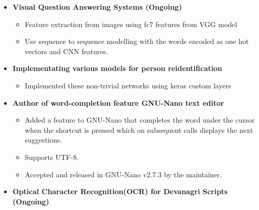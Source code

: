 \documentclass[10pt,a4paper,sans]{moderncv}        %
\begin{document}
\begin{itemize}

	\item{\textbf{Visual Question Answering Systems (Ongoing)}

\vspace{3pt}
	\small{\begin{itemize}

			\item Feature extraction from images using fc7 features from VGG model
			\item Use sequence to sequence modelling with the words encoded as one hot vectors and CNN features.

			\end{itemize}
	}}
	
	\vspace{3pt}

\item{\textbf{Implementating various models for person reidentification}

\vspace{3pt}
	\small{\begin{itemize}
		\item Implemented these non-trivial networks using keras custom layers
	
	\end{itemize}
	}}

	\vspace{3pt}
\item{\textbf{Author of word-completion feature GNU-Nano text editor}%

\vspace{3pt}

		\small{\begin{itemize}

			\item Added a feature to GNU-Nano that completes the word under the cursor when the shortcut  is pressed which
		on subsequent calls displays the next suggestions.
			\item Supports UTF-8.
		 	\item Accepted and released in GNU-Nano v2.7.3 by the maintainer.
			\end{itemize}
		}}

		\vspace{3pt}

\item{\textbf{Optical Character Recognition(OCR) for Devanagri Scripts (Ongoing)}

}
\end{itemize}
\end{document}
